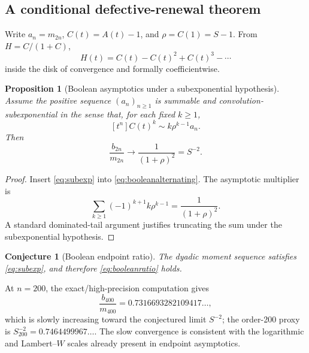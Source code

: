 \documentclass[11pt,oneside]{article}
\newtheorem{proposition}[theorem]{Proposition}
\newtheorem{conjecture}[theorem]{Conjecture}
\theoremstyle{definition}
\theoremstyle{remark}
\begin{document}
\subsection{A conditional defective-renewal theorem}
Write \(a_n=m_{2n}\), \(C(t)=A(t)-1\), and \(\rho=C(1)=S-1\). From \(H=C/(1+C)\),
\begin{equation}\label{eq:booleanalternating}
H(t)=C(t)-C(t)^2+C(t)^3-\cdots
\end{equation}
inside the disk of convergence and formally coefficientwise.

\begin{proposition}[Boolean asymptotics under a subexponential hypothesis]\label{prop:booleanrenewal}
Assume the positive sequence \((a_n)_{n\ge1}\) is summable and convolution-subexponential in the sense that, for each fixed \(k\ge1\),
\begin{equation}\label{eq:subexp}
[t^n]C(t)^k\sim k\rho^{k-1}a_n.
\end{equation}
Then
\begin{equation}\label{eq:booleanratio}
\frac{b_{2n}}{m_{2n}}\longrightarrow\frac1{(1+\rho)^2}=S^{-2}.
\end{equation}
\end{proposition}
\begin{proof}
Insert \eqref{eq:subexp} into \eqref{eq:booleanalternating}. The asymptotic multiplier is
\[
\sum_{k\ge1}(-1)^{k+1}k\rho^{k-1}=\frac1{(1+\rho)^2}.
\]
A standard dominated-tail argument justifies truncating the sum under the subexponential hypothesis.
\end{proof}

\begin{conjecture}[Boolean endpoint ratio]\label{conj:booleanratio}
The dyadic moment sequence satisfies \eqref{eq:subexp}, and therefore \eqref{eq:booleanratio} holds.
\end{conjecture}
At \(n=200\), the exact/high-precision computation gives
\[
\frac{b_{400}}{m_{400}}=0.7316693282109417\ldots,
\]
which is slowly increasing toward the conjectured limit \(S^{-2}\); the
order-200 proxy is \(S_{200}^{-2}=0.7464499967\ldots\).  The slow convergence
is consistent with the logarithmic and Lambert--\(W\) scales already present
in endpoint asymptotics.
\end{document}
